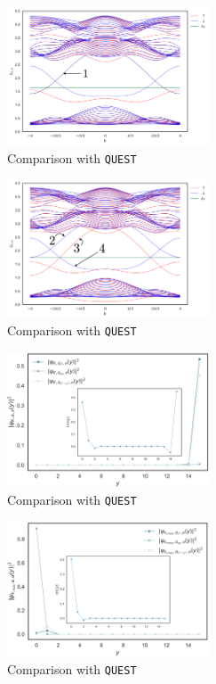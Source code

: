 \begin{figure}[H]
  \centering
  \includegraphics[width=6cm]{images/bands152.png}
  \caption{Comparison with \texttt{QUEST}}
  \label{fig:blade_flow_pressure}
\end{figure}

\begin{figure}[H]
  \centering
  \includegraphics[width=6cm]{images/bands154.png}
  \caption{Comparison with \texttt{QUEST}}
  \label{fig:blade_flow_pressure}
\end{figure}

\begin{figure}[H]
  \centering
  \includegraphics[width=6cm]{images/bottomEdgeMagProfU154.png}
  \caption{Comparison with \texttt{QUEST}}
  \label{fig:blade_flow_pressure}
\end{figure}

\begin{figure}[H]
  \centering
  \includegraphics[width=6cm]{images/topEdgeMagProfU13.png}
  \caption{Comparison with \texttt{QUEST}}
  \label{fig:blade_flow_pressure}
\end{figure}

